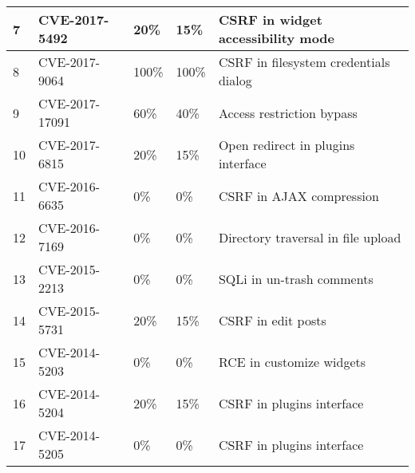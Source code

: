 \begin{table*}[]
\begin{adjustbox}{max width=0.65\textwidth}
\begin{tabular}{|lllll|}
    \multicolumn{1}{|l|}{7}           & \multicolumn{1}{l|}{CVE-2017-5492}    & \multicolumn{1}{l|}{20\%}                 & \multicolumn{1}{l|}{15\%}              & CSRF in widget accessibility mode       \\ \hline
    \multicolumn{1}{|l|}{8}           & \multicolumn{1}{l|}{CVE-2017-9064}    & \multicolumn{1}{l|}{100\%}                & \multicolumn{1}{l|}{100\%}             & CSRF in filesystem credentials dialog   \\ \hline
    \multicolumn{1}{|l|}{9}           & \multicolumn{1}{l|}{CVE-2017-17091}   & \multicolumn{1}{l|}{60\%}                 & \multicolumn{1}{l|}{40\%}              & Access restriction bypass               \\ \hline
    \multicolumn{1}{|l|}{10}          & \multicolumn{1}{l|}{CVE-2017-6815}    & \multicolumn{1}{l|}{20\%}                 & \multicolumn{1}{l|}{15\%}              & Open redirect in plugins interface      \\ \hline
    \multicolumn{1}{|l|}{11}          & \multicolumn{1}{l|}{CVE-2016-6635}    & \multicolumn{1}{l|}{0\%}                  & \multicolumn{1}{l|}{0\%}               & CSRF in AJAX compression                \\ \hline
    \multicolumn{1}{|l|}{12}          & \multicolumn{1}{l|}{CVE-2016-7169}    & \multicolumn{1}{l|}{0\%}                  & \multicolumn{1}{l|}{0\%}               & Directory traversal in file upload      \\ \hline
    \multicolumn{1}{|l|}{13}          & \multicolumn{1}{l|}{CVE-2015-2213}    & \multicolumn{1}{l|}{0\%}                  & \multicolumn{1}{l|}{0\%}               & SQLi in un-trash comments               \\ \hline
    \multicolumn{1}{|l|}{14}          & \multicolumn{1}{l|}{CVE-2015-5731}    & \multicolumn{1}{l|}{20\%}                 & \multicolumn{1}{l|}{15\%}              & CSRF in edit posts                      \\ \hline
    \multicolumn{1}{|l|}{15}          & \multicolumn{1}{l|}{CVE-2014-5203}    & \multicolumn{1}{l|}{0\%}                  & \multicolumn{1}{l|}{0\%}               & RCE in customize widgets                \\ \hline
    \multicolumn{1}{|l|}{16}          & \multicolumn{1}{l|}{CVE-2014-5204}    & \multicolumn{1}{l|}{20\%}                 & \multicolumn{1}{l|}{15\%}              & CSRF in plugins interface               \\ \hline
    \multicolumn{1}{|l|}{17}          & \multicolumn{1}{l|}{CVE-2014-5205}    & \multicolumn{1}{l|}{0\%}                  & \multicolumn{1}{l|}{0\%}               & CSRF in plugins interface               \\ \hline

\end{tabular}
\end{adjustbox}
\end{table*}
